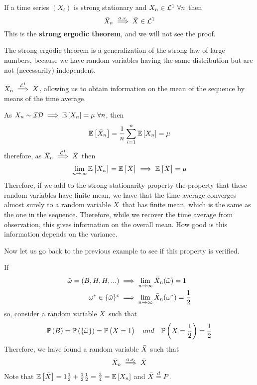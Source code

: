 \begin{theorem}
    If a time series $(X_t)$ is strong stationary and $X_n\in\el{1}\ \forall n$ then
    \[
        \bar{X}_n\stackrel{a.s.}{\implies}\bar{X}\in\mathcal{L}^{1}
    \]
    This is the \textbf{strong ergodic theorem}, and we will not see the proof.
\end{theorem}

The strong ergodic theorem is a generalization of the strong law of large numbers, because we have random variables having the same distribution but are not (necessarily) independent.

\begin{corollary}
    $\bar{X}_n\stackrel{\mathcal{L}^{1}}\implies\bar{X}$, allowing us to obtain information on the mean of the sequence by means of the time average.
\end{corollary}

\begin{remark}
    As $X_n\sim\mathcal{ID}\implies\expect{X_n}=\mu\ \forall n$, then 
    \[
        \mathbb{E}\left[\bar{X}_n\right]=\frac{1}{n}\sum_{i=1}^n\mathbb{E}\left[X_n\right]=\mu  
    \]
    therefore, as $\bar{X}_n\stackrel{\mathcal{L}^{1}}\implies\bar{X}$ then
    \[
        \lim_{n\to\infty}\mathbb{E}\left[\bar{X}_n\right]=\mathbb{E}\left[\bar{X}\right]\implies\mathbb{E}\left[\bar{X}\right]=\mu 
    \]
    Therefore, if we add to the strong stationarity property the property that these random variables have finite mean, we have that the time average converges almost surely to a random variable $\bar{X}$ that has finite mean, which is the same as the one in the sequence. Therefore, while we recover the time average from observation, this gives information on the overall mean. How good is this information depends on the variance.  
\end{remark}

Now let us go back to the previous example to see if this property is verified.

\begin{example}
    If
    \begin{equation*}
        \begin{split}
            \tilde{\omega}=(B,H,H,...)&\implies\lim_{n\to\infty}\bar{X}_n(\tilde{\omega})=1\\
            \omega^*\in\{\tilde{\omega}\}^c&\implies\lim_{n\to\infty}\bar{X}_n(\omega^*)=\frac{1}{2}\\
        \end{split}
    \end{equation*}
    so, consider a random variable $\bar{X}$ such that
    \[
        \prob{B}=\prob{\{\tilde{\omega}\}}=\prob{\mean{X}=1}\ \ \ and \ \ \ \prob{\mean{X}=\frac{1}{2}}=\frac{1}{2}
    \]
    Therefore, we have found a random variable $\bar{X}$ such that
    \[
        \bar{X}_n\stackrel{a.s.}{\implies}\bar{X}
    \]
    Note that $\mathbb{E}\left[\bar{X}\right]=1\frac{1}{2}+\frac{1}{2}\frac{1}{2}=\frac{3}{4}=\mathbb{E}\left[X_n\right]$ and $\bar{X}\stackrel{d}=P$.
\end{example}

